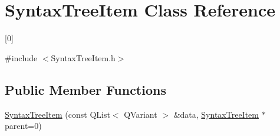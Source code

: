 \hypertarget{class_syntax_tree_item}{
\section{SyntaxTreeItem Class Reference}
\label{class_syntax_tree_item}
}


\mbox{[}0\mbox{]}  




{\ttfamily \#include $<$SyntaxTreeItem.h$>$}

\subsection*{Public Member Functions}
\begin{DoxyCompactItemize}
\item 
\hypertarget{class_syntax_tree_item_a7961a7be8b057c17e40b0b26ee591c9e}{
\hyperlink{class_syntax_tree_item_a7961a7be8b057c17e40b0b26ee591c9e}{SyntaxTreeItem} (const QList$<$ QVariant $>$ \&data, \hyperlink{class_syntax_tree_item}{SyntaxTreeItem} $\ast$parent=0)}
\label{class_syntax_tree_item_a7961a7be8b057c17e40b0b26ee591c9e}


\end{DoxyCompactItemize}
